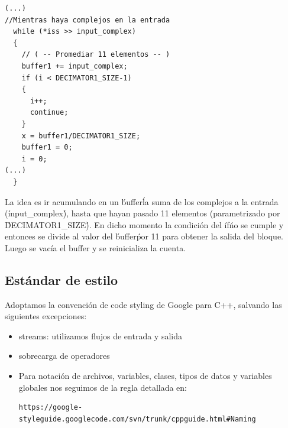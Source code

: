 \documentclass[10pt,a4paper]{article}
\begin{document}
\begin{verbatim}
(...)
//Mientras haya complejos en la entrada
  while (*iss >> input_complex)
  {
    // ( -- Promediar 11 elementos -- )
    buffer1 += input_complex;
    if (i < DECIMATOR1_SIZE-1)
    {
      i++;
      continue;
    }
    x = buffer1/DECIMATOR1_SIZE;
    buffer1 = 0;
    i = 0;
(...)
  }
\end{verbatim}
La idea es ir acumulando en un \'buffer\' la suma de los complejos a la entrada (\'input\_complex\'), hasta que hayan pasado 11 elementos (parametrizado por \'DECIMATOR1\_SIZE\'). En dicho momento la condición del \'if\' no se cumple y entonces se divide al valor del \'buffer\' por 11 para obtener la salida del bloque. Luego se vacía el buffer y se reinicializa la cuenta.\\



\subsection{Estándar de estilo}
Adoptamos la convención de code styling de Google para C++, salvando las siguientes excepciones:\\
\begin{itemize}
\item streams: utilizamos flujos de entrada y salida
\item sobrecarga de operadores
\item 

Para notación de archivos, variables, clases, tipos de datos y variables globales nos seguimos de la regla detallada en:
\begin{verbatim}
https://google-styleguide.googlecode.com/svn/trunk/cppguide.html#Naming
\end{verbatim}
\end{itemize}
\end{document}
